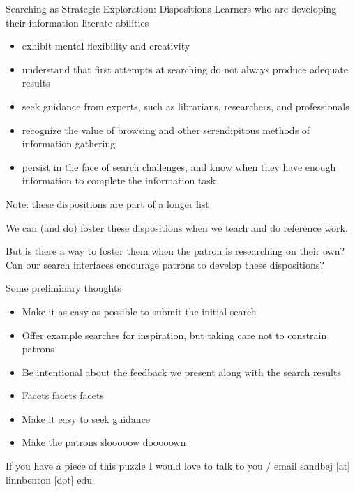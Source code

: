 \documentclass{beamer}
\begin{document}
\begin{frame}{Searching as Strategic Exploration: Dispositions}
Learners who are developing their information literate abilities

\begin{itemize}
 \item exhibit mental flexibility and creativity
 \item understand that first attempts at searching do not always produce adequate results
 \item seek guidance from experts, such as librarians, researchers, and professionals
 \item recognize the value of browsing and other serendipitous methods of information gathering
 \item persist in the face of search challenges, and know when they have enough information to complete the information task
\end{itemize}

\vfill
Note: these dispositions are part of a longer list

\end{frame}

\begin{frame}
 We can (and do) foster these dispositions when we teach and do reference work.
 
 \vspace{1in}
 
 But is there a way to foster them when the patron is researching on their own?  Can our search interfaces encourage patrons to develop these dispositions?
\end{frame}


\begin{frame}{Some preliminary thoughts}

\begin{itemize}
 \item Make it as easy as possible to submit the initial search
 \item Offer example searches for inspiration, but taking care not to constrain patrons
 \item Be intentional about the feedback we present along with the search results
 \item Facets facets facets
 \item Make it easy to seek guidance
 \item Make the patrons slooooow dooooown
\end{itemize}


\end{frame}

\begin{frame}{If you have a piece of this puzzle}
I would love to talk to you / email
\vfill
sandbej [at] linnbenton [dot] edu
\end{frame}
\end{document}
